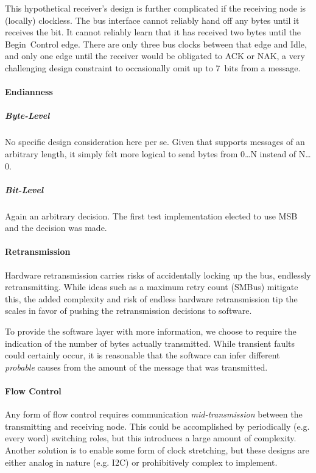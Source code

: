 This hypothetical receiver's design is further complicated if the receiving
node is (locally) clockless. The bus interface cannot reliably hand off any
bytes until it receives the \textit{} bit. It cannot reliably learn
that it has received two bytes until the Begin~Control edge. There are only
three bus clocks between that edge and Idle, and only one edge until the
receiver would be obligated to ACK or NAK, a very challenging design
constraint to occasionally omit up to 7~bits from a message.

\paragraph{Endianness}
\subparagraph{Byte-Level}
No specific design consideration here per se. Given that \bus supports
messages of an arbitrary length, it simply felt more logical to send bytes
from 0{\ldots}N instead of N{\ldots}0.
\subparagraph{Bit-Level}
Again an arbitrary decision. The first test implementation elected to use MSB
and the decision was made.

\paragraph{Retransmission}
Hardware retransmission carries risks of accidentally locking up the bus,
endlessly retransmitting. While ideas such as a maximum retry count (SMBus)
mitigate this, the added complexity and risk of endless hardware
retransmission tip the scales in favor of pushing the retransmission decisions
to software.

To provide the software layer with more information, we choose to require the
indication of the number of bytes actually transmitted. While transient faults
could certainly occur, it is reasonable that the software can infer different
{\em probable} causes from the amount of the message that was transmitted.

\paragraph{Flow Control}
Any form of flow control requires communication {\em mid-transmission} between
the transmitting and receiving node. This could be accomplished by
periodically (e.g. every word) switching roles, but this introduces a large
amount of complexity. Another solution is to enable some form of clock
stretching, but these designs are either analog in nature (e.g.  I2C) or
prohibitively complex to implement.

